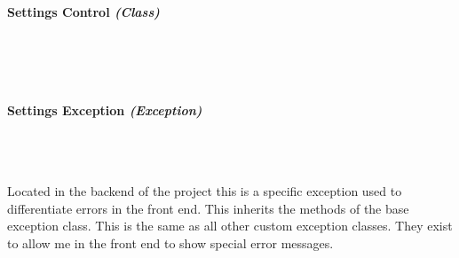 \begin{FlushLeft}
    \bk

    \pagebreak
\paragraph{Settings Control \textit{(Class)}} \mbox{} \\

    \begin{figure}[H]
        \centering
    \end{figure}\\

    \bk

    \pagebreak
\paragraph{Settings Exception \textit{(Exception)}} \mbox{} \\

    \begin{figure}[H]
        \centering
    \end{figure}\\
    Located in the backend of the project this is a specific exception used to differentiate errors in the front end. This inherits the methods of the base exception class. This is the same as all other custom exception classes. They exist to allow me in the front end to show special error messages.
    \bk


\end{FlushLeft}
